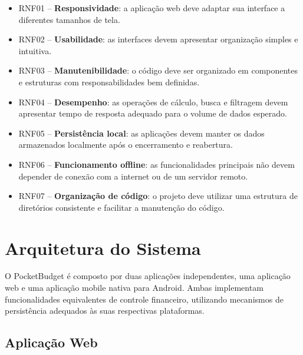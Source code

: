 \documentclass[12pt,a4paper]{article}
\begin{document}
\begin{itemize}
    \item RNF01 -- \textbf{Responsividade}: a aplicação web deve adaptar sua interface a diferentes tamanhos de tela.
    
    \item RNF02 -- \textbf{Usabilidade}: as interfaces devem apresentar organização simples e intuitiva.
    
    \item RNF03 -- \textbf{Manutenibilidade}: o código deve ser organizado em componentes e estruturas com responsabilidades bem definidas.
    
    \item RNF04 -- \textbf{Desempenho}: as operações de cálculo, busca e filtragem devem apresentar tempo de resposta adequado para o volume de dados esperado.
    
    \item RNF05 -- \textbf{Persistência local}: as aplicações devem manter os dados armazenados localmente após o encerramento e reabertura.
    
    \item RNF06 -- \textbf{Funcionamento offline}: as funcionalidades principais não devem depender de conexão com a internet ou de um servidor remoto.
    
    \item RNF07 -- \textbf{Organização de código}: o projeto deve utilizar uma estrutura de diretórios consistente e facilitar a manutenção do código.
\end{itemize}

\section{Arquitetura do Sistema}

O PocketBudget é composto por duas aplicações independentes, uma aplicação web e uma aplicação mobile nativa para Android. Ambas implementam funcionalidades equivalentes de controle financeiro, utilizando mecanismos de persistência adequados às suas respectivas plataformas.

\subsection{Aplicação Web}
\end{document}
